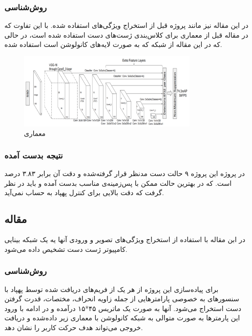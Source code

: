 \subsubsection{روش‌شناسی}
در این مقاله نیز مانند پروژه قبل از استخراج ویژگی‌های  استفاده شده. با این تفاوت که در مقاله قبل از معماری  برای کلاس‌بندی ژست‌های دست استفاده شده است، در حالی که در این مقاله از شبکه  که به صورت لایه‌های کانولوشن است استفاده شده.

\begin{figure}[h]
    \centering
    \includegraphics[width=0.8\textwidth]{VGG16.png}
    \caption{معماری }
\end{figure}


\subsubsection{نتیجه بدست آمده}
 در پروژه این پروژه ۹ حالت دست مدنظر قرار گرفته‌شده و دقت آن برابر ۳.۸۳ درصد است.
 که در بهترین حالت ممکن با پس‌زمینه‌ی مناسب بدست آمده و باید در نظر گرفت که دقت بالایی برای کنترل پهپاد به حساب نمی‌آید.



\subsection{مقاله }
در ابن مقاله با استفاده از استخراج ویژگی‌های تصویر و ورودی آنها یه یک شبکه بینایی کامپیوتر ژست دست تشخیص داده می‌شود.


\subsubsection{روش‌شناسی}
برای پیاده‌سازی این پروژه از هر یک از فریم‌های دریافت شده توسط پهپاد با سنسورهای به خصوصی پارامترهایی از جمله زاویه انحراف، مختصات، قدرت گرفتن دست استخراج می‌شود. آنها به صورت یک ماتریس ۴۵*۱۵ درآمده و در ادامه با ورود این پارمتر‌ها به صورت متوالی به شبکه کانولوشن با معماری زیر داده‌شده و دریافت خروجی می‌تواند هدف حرکت کاربر را نشان دهد.
